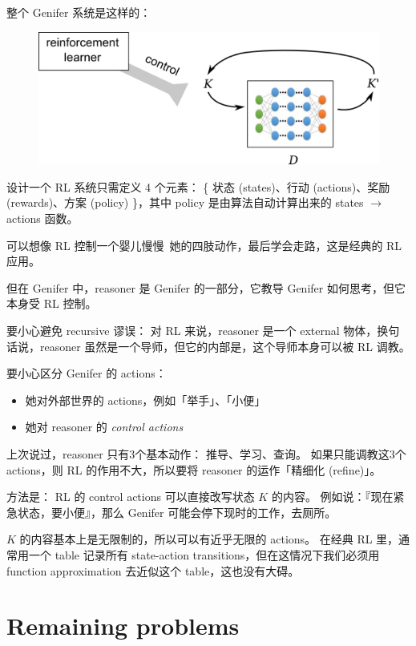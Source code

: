 \documentclass[12pt]{article}
\begin{document}
整个 Genifer 系统是这样的：
\begin{figure}[H]
\centering
\includegraphics[scale=0.75]{genifer-model-0.png}
\end{figure}

设计一个 RL 系统只需定义 4 个元素： \{ 状态 (states)、行动 (actions)、奖励 (rewards)、方案 (policy) \}，其中 policy 是由算法自动计算出来的 states $\rightarrow$ actions 函数。

可以想像 RL 控制一个婴儿慢慢~她的四肢动作，最后学会走路，这是经典的 RL 应用。

但在 Genifer 中，reasoner 是 Genifer 的一部分，它教导 Genifer 如何思考，但它本身受 RL 控制。

要小心避免 recursive 谬误： 对 RL 来说，reasoner 是一个 external 物体，换句话说，reasoner 虽然是一个导师，但它的内部是，这个导师本身可以被 RL 调教。

要小心区分 Genifer 的 actions：
\begin{itemize}
\item 她对外部世界的 actions，例如「举手」、「小便」
\item 她对 reasoner 的 \textit{control actions}
\end{itemize}

上次说过，reasoner 只有3个基本动作： 推导、学习、查询。  如果只能调教这3个 actions，则 RL 的作用不大，所以要将 reasoner 的运作「精细化 (refine)」。

方法是： RL 的 control actions 可以直接改写状态 $K$ 的内容。 例如说：『现在紧急状态，要小便』，那么 Genifer 可能会停下现时的工作，去厕所。

$K$ 的内容基本上是无限制的，所以可以有近乎无限的 actions。 在经典 RL 里，通常用一个 table 记录所有 state-action transitions，但在这情况下我们必须用 function approximation 去近似这个 table，这也没有大碍。 

\section{Remaining problems}
\end{document}
